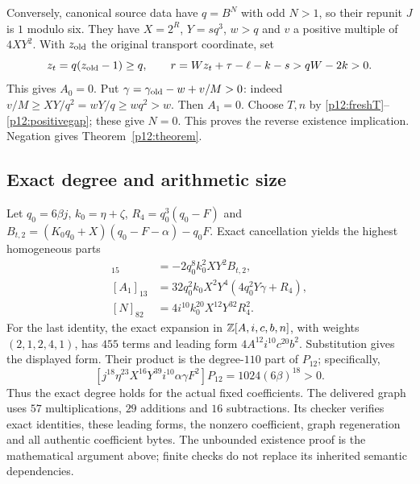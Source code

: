 Conversely, canonical source data have $q=B^N$ with odd $N>1$, so their
repunit $J$ is $1$ modulo six. They have $X=2^R$, $Y=sq^3$, $w>q$ and
$v$ a positive multiple of $4XY^2$. With $z_{\rm old}$ the original
transport coordinate, set
\[
 z_t=q(z_{\rm old}-1)\ge q,\qquad
 r=Wz_t+\tau-\ell-k-s>qW-2k>0.
\]
This gives $A_0=0$. Put $\gamma=\gamma_{\rm old}-w+v/M>0$:
indeed $v/M\ge XY/q^2=wY/q\ge wq^2>w$. Then $A_1=0$.
Choose $T,n$ by \eqref{p12:freshT}--\eqref{p12:positivegap}; these give
$N=0$. This proves the reverse existence implication. Negation gives
Theorem~\ref{p12:theorem}.

\subsection{Exact degree and arithmetic size}
\label{p12:degree}

Let $q_0=6\beta j$, $k_0=\eta+\zeta$, $R_4=q_0^3(q_0-F)$ and
$B_{t,2}=(K_0q_0+X)(q_0-F-\alpha)-q_0F$.
Exact cancellation yields the highest homogeneous parts
\begin{align*}
 [A_0]_{15}&=-2q_0^8k_0^2XY^2B_{t,2},\\
 [A_1]_{13}&=32q_0^2k_0X^2Y^4(4q_0^2Y\gamma+R_4),\\
 [N]_{82}&=4i^{10}k_0^{20}X^{12}Y^{32}R_4^2.
\end{align*}
For the last identity, the exact expansion in
$\mathbb Z[A,i,c,b,n]$, with weights $(2,1,2,4,1)$, has $455$ terms and
leading form $4A^{12}i^{10}c^{20}b^2$. Substitution gives the displayed
form. Their product is the degree-$110$ part of $P_{12}$; specifically,
\[
 [j^{18}\eta^{23}X^{16}Y^{39}i^{10}\alpha\gamma F^2]P_{12}
       =1024(6\beta)^{18}>0.
\]
Thus the exact degree holds for the actual fixed coefficients.
The delivered graph uses $57$ multiplications, $29$ additions and $16$
subtractions. Its checker verifies exact identities, these leading forms,
the nonzero coefficient, graph regeneration and all authentic coefficient
bytes. The unbounded existence proof is the mathematical argument above;
finite checks do not replace its inherited semantic dependencies.
